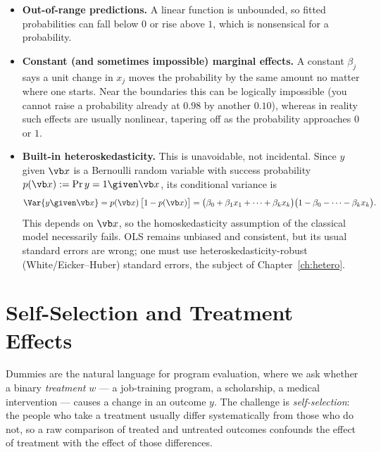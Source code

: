 \begin{itemize}
\item \textbf{Out-of-range predictions.} A linear function is unbounded, so fitted probabilities can fall below $0$ or rise above $1$, which is nonsensical for a probability.
\item \textbf{Constant (and sometimes impossible) marginal effects.} A constant $\beta_j$ says a unit change in $x_j$ moves the probability by the same amount no matter where one starts. Near the boundaries this can be logically impossible (you cannot raise a probability already at $0.98$ by another $0.10$), whereas in reality such effects are usually nonlinear, tapering off as the probability approaches $0$ or $1$.
\item \textbf{Built-in heteroskedasticity.} This is unavoidable, not incidental. Since $y$ given $\vb x$ is a Bernoulli random variable with success probability $p(\vb x) := \Pr{y=1\given \vb x}$, its conditional variance is
\[
\Var{y \given \vb x} = p(\vb x)\,\big[1 - p(\vb x)\big] = \big(\beta_0 + \beta_1 x_1 + \cdots + \beta_k x_k\big)\big(1 - \beta_0 - \cdots - \beta_k x_k\big).
\]
This depends on $\vb x$, so the homoskedasticity assumption of the classical model necessarily fails. OLS remains unbiased and consistent, but its usual standard errors are wrong; one must use heteroskedasticity-robust (White/Eicker--Huber) standard errors, the subject of Chapter~\ref{ch:hetero}.
\end{itemize}


\section{Self-Selection and Treatment Effects}

Dummies are the natural language for program evaluation, where we ask whether a binary \emph{treatment} $w$ --- a job-training program, a scholarship, a medical intervention --- causes a change in an outcome $y$. The challenge is \emph{self-selection}: the people who take a treatment usually differ systematically from those who do not, so a raw comparison of treated and untreated outcomes confounds the effect of treatment with the effect of those differences.

